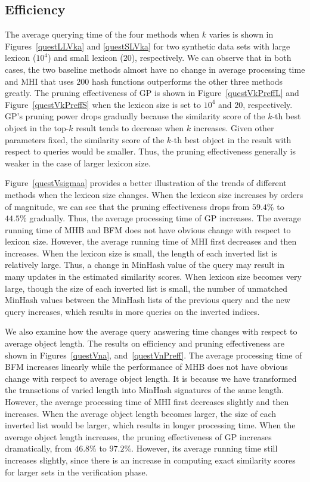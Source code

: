 \subsection{Efficiency}    
The average querying time of the four methods when $k$ varies is shown in Figures~\ref{questLLVka} and \ref{questSLVka} for two synthetic data sets with large lexicon ($10^4$) and small lexicon ($20$), respectively. We can observe that in both cases, the two baseline methods almost have no change in average processing time and MHI that uses $200$ hash functions outperforms the other three methods greatly. The pruning effectiveness of GP is shown in Figure~\ref{questVkPreffL} and Figure~\ref{questVkPreffS} when the lexicon size is set to $10^4$ and $20$, respectively. GP's pruning power drops gradually because the similarity score of the $k$-th best object in the top-$k$ result tends to decrease when $k$ increases. Given other parameters fixed, the similarity score of the $k$-th best object in the result with respect to queries would be smaller. Thus, the pruning effectiveness generally is weaker in the case of larger lexicon size. 

Figure~\ref{questVsigmaa} provides a better illustration of the trends of different methods when the lexicon size changes. When the lexicon size increases by orders of magnitude, we can see that the pruning effectiveness drops from $59.4\%$ to $44.5\%$ gradually. Thus, the average processing time of GP increases. The average running time of MHB and BFM does not have obvious change with respect to lexicon size. However, the average running time of MHI first decreases and then increases. When the lexicon size is small, the length of each inverted list is relatively large. Thus, a change in MinHash value of the query may result in many updates in the estimated similarity scores. When lexicon size becomes very large, though the size of each inverted list is small, the number of unmatched MinHash values between the MinHash lists of the previous query and the new query increases, which results in more queries on the inverted indices. 

We also examine how the average query answering time changes with respect to average object length. The results on efficiency and pruning effectiveness are shown in Figures~\ref{questVna}, and~\ref{questVnPreff}. The average processing time of BFM increases linearly while the performance of MHB does not have obvious change with respect to average object length. It is because we have transformed the transctions of varied length into MinHash signatures of the same length. However, the average processing time of MHI first decreases slightly and then increases. When the average object length becomes larger, the size of each inverted list would be larger, which results in longer processing time. When the average object length increases, the pruning effectiveness of GP increases dramatically, from $46.8\%$ to $97.2\%$. However, its average running time still increases slightly, since there is an increase in computing exact similarity scores for larger sets in the verification phase.   


